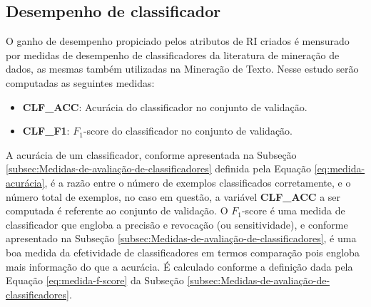     \subsection{Desempenho de classificador}  \label{subsec:Desempenho-de-classificador}
        O ganho de desempenho propiciado pelos atributos de RI criados é mensurado por medidas de desempenho de classificadores da literatura de mineração de dados, as mesmas também utilizadas na Mineração de Texto.
        Nesse estudo serão computadas as seguintes medidas:
        \begin{itemize}
            \item \textbf{CLF\_ACC}: Acurácia do classificador no conjunto de validação.
            \item \textbf{CLF\_F1}: $F_1$-score do classificador no conjunto de validação.
            
    
        \end{itemize}
        A acurácia de um classificador, conforme apresentada na Subseção \ref{subsec:Medidas-de-avaliação-de-classificadores} definida pela Equação \ref{eq:medida-acurácia}, é a razão entre o número de exemplos classificados corretamente, e o número total de exemplos, no caso em questão, a variável \textbf{CLF\_ACC} a ser computada é referente ao conjunto de validação.
        O $F_1$-score é uma medida de classificador que engloba a precisão e revocação (ou sensitividade), e conforme apresentado na Subseção \ref{subsec:Medidas-de-avaliação-de-classificadores}, é uma boa medida da efetividade de classificadores em termos comparação pois engloba mais informação do que a acurácia. 
        É calculado conforme a definição dada pela Equação \ref{eq:medida-f-score} da Subseção \ref{subsec:Medidas-de-avaliação-de-classificadores}.
        
        
    

